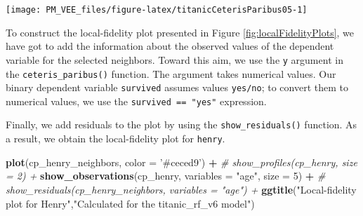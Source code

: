 \documentclass[12pt,]{krantz}
\newenvironment{Shaded}{\begin{snugshade}}{\end{snugshade}}
\newcommand{\CommentTok}[1]{\textcolor[rgb]{0.56,0.35,0.01}{\textit{#1}}}
\newcommand{\DataTypeTok}[1]{\textcolor[rgb]{0.13,0.29,0.53}{#1}}
\newcommand{\DecValTok}[1]{\textcolor[rgb]{0.00,0.00,0.81}{#1}}
\newcommand{\FloatTok}[1]{\textcolor[rgb]{0.00,0.00,0.81}{#1}}
\newcommand{\KeywordTok}[1]{\textcolor[rgb]{0.13,0.29,0.53}{\textbf{#1}}}
\newcommand{\NormalTok}[1]{#1}
\newcommand{\OperatorTok}[1]{\textcolor[rgb]{0.81,0.36,0.00}{\textbf{#1}}}
\newcommand{\StringTok}[1]{\textcolor[rgb]{0.31,0.60,0.02}{#1}}
\begin{document}
\begin{center}\texttt{[image: PM\_VEE\_files/figure-latex/titanicCeterisParibus05-1]} \end{center}

To construct the local-fidelity plot presented in Figure \ref{fig:localFidelityPlots}, we have got to add the information about the observed values of the dependent variable for the selected neighbors. Toward this aim, we use the \texttt{y} argument in the \texttt{ceteris\_paribus()} function. The argument takes numerical values. Our binary dependent variable \texttt{survived} assumes values \texttt{yes/no}; to convert them to numerical values, we use the \texttt{survived\ ==\ "yes"} expression.

\begin{Shaded}
\end{Shaded}

Finally, we add residuals to the plot by using the \texttt{show\_residuals()} function. As a result, we obtain the local-fidelity plot for \texttt{henry}.

\begin{Shaded}
\begin{Highlighting}[]
\KeywordTok{plot}\NormalTok{(cp_henry_neighbors, }\DataTypeTok{color =} \StringTok{'#ceced9'}\NormalTok{) }\OperatorTok{+}
\CommentTok{#  show_profiles(cp_henry, size = 2) + }
\StringTok{  }\KeywordTok{show_observations}\NormalTok{(cp_henry, }\DataTypeTok{variables =} \StringTok{"age"}\NormalTok{, }\DataTypeTok{size =} \DecValTok{5}\NormalTok{) }\OperatorTok{+}
\CommentTok{#  show_residuals(cp_henry_neighbors, variables = "age") +}
\StringTok{  }\KeywordTok{ggtitle}\NormalTok{(}\StringTok{"Local-fidelity plot for Henry"}\NormalTok{,}\StringTok{"Calculated for the titanic_rf_v6 model"}\NormalTok{)}
\end{Highlighting}
\end{Shaded}
\end{document}
